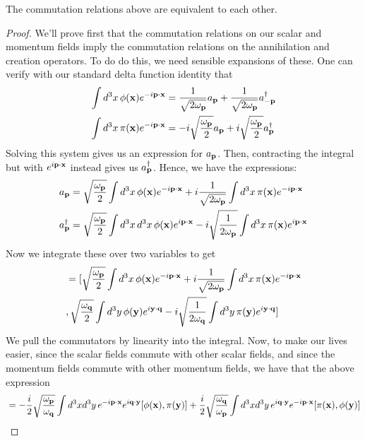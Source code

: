 \begin{thm} 
The commutation relations above are equivalent to each other. 

\begin{proof} 
We'll prove first that the commutation relations on our scalar and momentum fields imply the commutation relations on the annihilation and creation operators. To do do this, we need sensible expansions of these. One can verify with our standard delta function identity that 
\begin{align*} 
\int d^3 x \,  \phi ( \mathbf{ x }) e^{ - i \mathbf{ p } \cdot \mathbf{x} }  &= \frac{ 1}{ \sqrt{ 2 \omega_\mathbf{ p } } } a_{ \mathbf{ p }} +  \frac{ 1}{ \sqrt{ 2 \omega_\mathbf{ p } } } a^\dagger_{ \mathbf{  -p }} \\
\int d^3 x \,  \pi (\mathbf{ x }) e^{ - i \mathbf{ p } \cdot \mathbf{x} } &=  - i \sqrt{ \frac{ \omega_\mathbf{  p}}{ 2} } a_{ \mathbf{ p }}  + i \sqrt{ \frac{ \omega_\mathbf{  p}}{ 2} }a^\dagger_{ \mathbf{  p  }} 
\end{align*} 
Solving this system gives us an expression for $a_{ \mathbf{  p }} $. Then, contracting the integral but with $ e^{ i \mathbf{ p } \cdot \mathbf{x} } $ instead gives us $a^\dagger_{ \mathbf{  p  }}$. Hence, we have the expressions: 
\begin{align*} 
a_{ \mathbf{ p  }}  &= \sqrt{ \frac{ \omega_\mathbf{  p } }{2} } \int d^3 x   \, \phi ( \mathbf{  x }) e^{ - i \mathbf{  p  } \cdot \mathbf{x} }  + i \frac{ 1} { \sqrt { 2 \omega_\mathbf{ p}}}  \int d^3 x \, \pi (\mathbf{ x }) e^{ - i \mathbf{  p  } \cdot \mathbf{x} }  \\
a^\dagger_{ \mathbf{ p }} &= \sqrt{ \frac{ \omega_\mathbf{ p}}{ 2} } \int d^3 x \, d^3 x \, \phi ( \mathbf{ x }) e^{ i \mathbf{ p } \cdot \mathbf{x} }  - i \sqrt{ \frac{ 1}{ 2 \omega_\mathbf{  p }}} \int d^3 x \, \pi (\mathbf{ x }) e^{ i \mathbf{  p  } \cdot \mathbf{x} } 
\end{align*} 
Now we integrate these over two variables to get 
\begin{align*} 
[\ann{p}, \crea{q} ] & = [  \sqrt{ \frac{ \freq{ p } }{2} } \int d^3 x   \, \scal{ x} \nmode{ p }  + i \frac{ 1} { \sqrt { 2 \freq{p}}}  \int d^3 x \, \mom{x} \nmode{ p }  \\
&, \sqrt{ \frac{ \freq{q}}{ 2} } \int d^3 y \, \scal{y} e^{  i \mathbf{y } \cdot \mathbf{q} }  - i \sqrt{ \frac{ 1}{ 2 \freq{ q }}} \int d^3 y \, \mom{y} e^{i \mathbf{ y} \cdot \mathbf{ q} }  ] 
\end{align*} 
We pull the commutators by linearity into the integral. Now, to make our lives easier, since the scalar fields commute with other scalar fields, and since the momentum fields commute with other momentum fields, we have that the above expression 
\begin{align*} 
[\ann{p}, \crea{q} ]  & =  - \frac{ i }{ 2} \sqrt{ \frac{ \freq{p}}{ \freq {q} } } \int d^3 x d^3 y \,  \nmode{p} e^{ i \mathbf{q} \cdot \mathbf{ y } } [ \scal{x}, \mom{y } ]  + \frac{ i }{ 2} \sqrt { \frac{ \freq{q} } { \freq{p}}} \int d^3 x d^3 y \, e^{ i \mathbf{q} \cdot \mathbf{y } }  \nmode{p} [ \mom { x} , \scal{y} ] \\

\end{align*}
\end{proof}
\end{thm}
